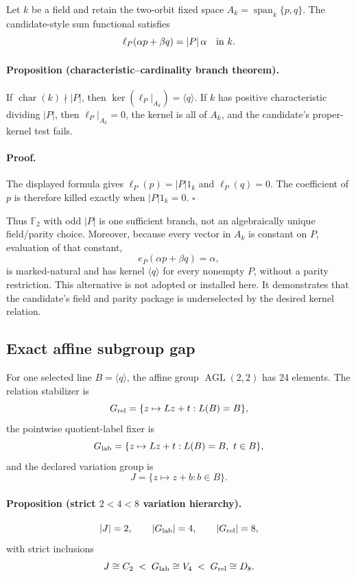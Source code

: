 Let \(k\) be a field and retain the two-orbit fixed space
\(A_k=\operatorname{span}_k\{p,q\}\).  The candidate-style sum functional
satisfies
\[
 \ell_P(\alpha p+\beta q)=|P|\,\alpha\quad\hbox{in }k.
\]

\paragraph{Proposition (characteristic--cardinality branch theorem).}
If \(\operatorname{char}(k)\nmid |P|\), then
\(\ker(\ell_P|_{A_k})=\langle q\rangle\).  If \(k\) has positive
characteristic dividing \(|P|\), then
\(\ell_P|_{A_k}=0\), the kernel is all of \(A_k\), and the candidate's
proper-kernel test fails.

\paragraph{Proof.}
The displayed formula gives
\(\ell_P(p)=|P|1_k\) and \(\ell_P(q)=0\).  The coefficient of \(p\) is
therefore killed exactly when \(|P|1_k=0\). \(\square\)

Thus \(\mathbb F_2\) with odd \(|P|\) is one sufficient branch, not an
algebraically unique field/parity choice.  Moreover, because every vector in
\(A_k\) is constant on \(P\), evaluation of that constant,
\[
 e_P(\alpha p+\beta q)=\alpha ,
\]
is marked-natural and has kernel \(\langle q\rangle\) for every nonempty
\(P\), without a parity restriction.  This alternative is not adopted or
installed here.  It demonstrates that the candidate's field and parity
package is underselected by the desired kernel relation.

\subsection{Exact affine subgroup gap}

For one selected line \(B=\langle q\rangle\), the affine group
\(\operatorname{AGL}(2,2)\) has 24 elements.  The relation stabilizer is
\[
 G_{\rm rel}=\{z\mapsto Lz+t:L(B)=B\},
\]
the pointwise quotient-label fixer is
\[
 G_{\rm lab}=\{z\mapsto Lz+t:L(B)=B,\ t\in B\},
\]
and the declared variation group is
\[
 J=\{z\mapsto z+b:b\in B\}.
\]

\paragraph{Proposition (strict \(2<4<8\) variation hierarchy).}
\[
 |J|=2,\qquad |G_{\rm lab}|=4,\qquad |G_{\rm rel}|=8,
\]
with strict inclusions
\[
 J\cong C_2\;<\;G_{\rm lab}\cong V_4\;<\;
 G_{\rm rel}\cong D_8.
\]

